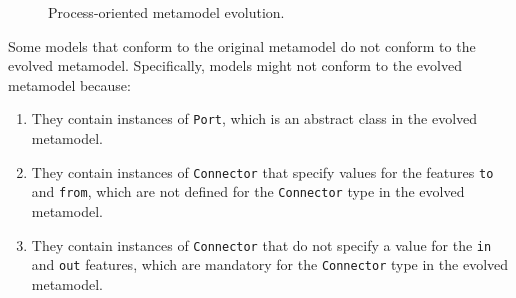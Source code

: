 \begin{figure}[htbp]
    \centering
    \caption{Process-oriented metamodel evolution.}
    \label{fig:po_mms}
\end{figure}

Some models that conform to the original metamodel do not conform to the evolved metamodel. Specifically, models might not conform to the evolved metamodel because:

\begin{enumerate}
	\item They contain instances of \texttt{Port}, which is an abstract class in the evolved metamodel.
	\item They contain instances of \texttt{Connector} that specify values for the features \texttt{to} and \texttt{from}, which are not defined for the \texttt{Connector} type in the evolved metamodel.
	\item They contain instances of \texttt{Connector} that do not specify a value for the \texttt{in} and \texttt{out} features, which are mandatory for the \texttt{Connector} type in the evolved metamodel.
\end{enumerate}

